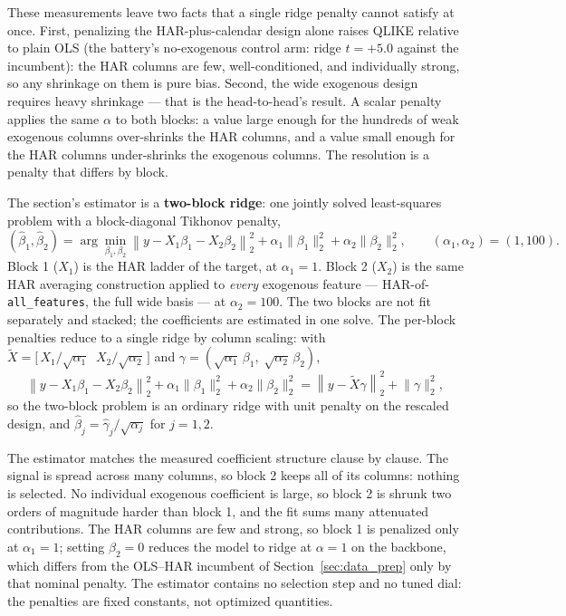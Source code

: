 These measurements leave two facts that a single ridge penalty cannot
satisfy at once. First, penalizing the HAR-plus-calendar design alone
raises QLIKE relative to plain OLS (the battery's no-exogenous control arm:
ridge $t = +5.0$ against the incumbent): the HAR columns are few,
well-conditioned, and individually strong, so any shrinkage on them is pure
bias. Second, the wide exogenous design requires heavy shrinkage --- that is
the head-to-head's result. A scalar penalty applies the same $\alpha$ to both
blocks:
a value large enough for the hundreds of weak exogenous columns over-shrinks
the HAR columns, and a value small enough for the HAR columns under-shrinks
the exogenous columns. The resolution is a penalty that differs by block.

The section's estimator is a \textbf{two-block ridge}: one jointly solved
least-squares problem with a block-diagonal Tikhonov penalty,
\[
(\hat\beta_1, \hat\beta_2)
= \arg\min_{\beta_1, \beta_2}
  \left\lVert y - X_1 \beta_1 - X_2 \beta_2 \right\rVert_2^2
  + \alpha_1 \lVert \beta_1 \rVert_2^2
  + \alpha_2 \lVert \beta_2 \rVert_2^2,
\qquad (\alpha_1, \alpha_2) = (1, 100).
\]
Block 1 ($X_1$) is the HAR ladder of the target, at $\alpha_1 = 1$. Block 2
($X_2$) is the same HAR averaging construction applied to \emph{every}
exogenous feature --- HAR-of-\texttt{all\_features}, the full wide basis ---
at $\alpha_2 = 100$. The two blocks are not fit separately and stacked; the
coefficients are estimated in one solve. The per-block penalties reduce to a
single ridge by column scaling: with
$\tilde X = \bigl[\, X_1 / \sqrt{\alpha_1} \;\; X_2 / \sqrt{\alpha_2} \,\bigr]$
and $\gamma = (\sqrt{\alpha_1}\, \beta_1,\; \sqrt{\alpha_2}\, \beta_2)$,
\[
\left\lVert y - X_1 \beta_1 - X_2 \beta_2 \right\rVert_2^2
+ \alpha_1 \lVert \beta_1 \rVert_2^2
+ \alpha_2 \lVert \beta_2 \rVert_2^2
= \left\lVert y - \tilde X \gamma \right\rVert_2^2
+ \lVert \gamma \rVert_2^2 ,
\]
so the two-block problem is an ordinary ridge with unit penalty on the
rescaled design, and $\hat\beta_j = \hat\gamma_j / \sqrt{\alpha_j}$ for
$j = 1, 2$.

The estimator matches the measured coefficient structure clause by clause.
The signal is spread across many columns, so block 2 keeps all of its
columns: nothing is selected. No individual exogenous coefficient is large,
so block 2 is shrunk two orders of magnitude harder than block 1, and the
fit sums many attenuated contributions. The HAR columns are few and strong,
so block 1 is penalized only at $\alpha_1 = 1$; setting $\beta_2 = 0$
reduces the model to ridge at $\alpha = 1$ on the backbone, which differs
from the OLS--HAR incumbent of Section~\ref{sec:data_prep} only by that
nominal penalty. The estimator contains no selection step and no tuned
dial: the penalties are fixed constants, not optimized quantities.

